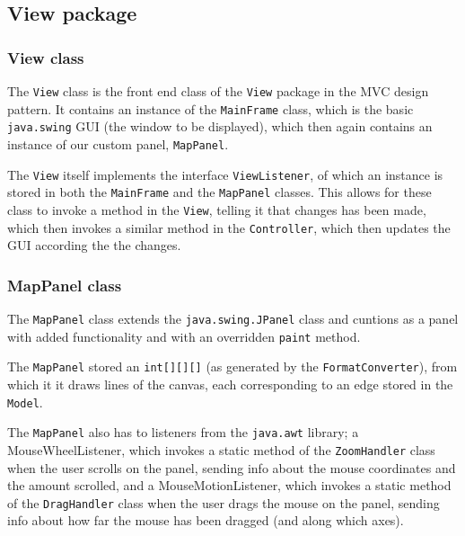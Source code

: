 \documentclass[a4paper,11pt]{article}
\begin{document}
\subsection{View package} %

\subsubsection{View class} %
The \texttt{View} class is the front end class of the \texttt{View} package in the MVC design pattern. It contains an instance of the \texttt{MainFrame} class, which is the basic \texttt{java.swing} GUI (the window to be displayed), which then again contains an instance of our custom panel, \texttt{MapPanel}.

The \texttt{View} itself implements the interface \texttt{ViewListener}, of which an instance is stored in both the \texttt{MainFrame} and the \texttt{MapPanel} classes. This allows for these class to invoke a method in the \texttt{View}, telling it that changes has been made, which then invokes a similar method in the \texttt{Controller}, which then updates the GUI according the the changes.

\subsubsection{MapPanel class} %
The \texttt{MapPanel} class extends the \texttt{java.swing.JPanel} class and cuntions as a panel with added functionality and with an overridden \texttt{paint} method.

The \texttt{MapPanel} stored an \texttt{int[][][]} (as generated by the \texttt{FormatConverter}), from which it it draws lines of the canvas, each corresponding to an edge stored in the \texttt{Model}.

The \texttt{MapPanel} also has to listeners from the \texttt{java.awt} library; a MouseWheelListener, which invokes a static method of the \texttt{ZoomHandler} class when the user scrolls on the panel, sending info about the mouse coordinates and the amount scrolled, and a MouseMotionListener, which invokes a static method of the \texttt{DragHandler} class when the user drags the mouse on the panel, sending info about how far the mouse has been dragged (and along which axes).
\end{document}
